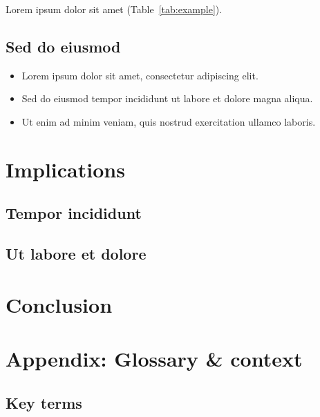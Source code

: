 \documentclass[11pt]{article}
\begin{document}
Lorem ipsum dolor sit amet (Table~\ref{tab:example}).

\subsection{Sed do eiusmod}

\lipsum[6]

\begin{itemize}
  \item Lorem ipsum dolor sit amet, consectetur adipiscing elit.
  \item Sed do eiusmod tempor incididunt ut labore et dolore magna aliqua.
  \item Ut enim ad minim veniam, quis nostrud exercitation ullamco laboris.
\end{itemize}

\section{Implications}

\subsection{Tempor incididunt}

\lipsum[7]

\subsection{Ut labore et dolore}

\lipsum[8]

\section*{Conclusion}

\lipsum[9-10]

\clearpage
\section*{Appendix: Glossary \& context}

\subsection*{Key terms}
\end{document}
